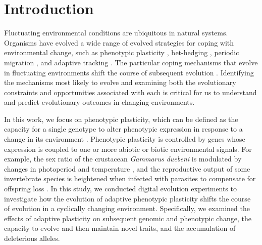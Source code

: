 
\section{Introduction}

Fluctuating environmental conditions are ubiquitous in natural systems. 
Organisms have evolved a wide range of evolved strategies for coping with environmental change, such as 
phenotypic plasticity \citep{ghalambor_adaptive_2007}, 
bet-hedging \citep{beaumont_experimental_2009}, 
periodic migration \citep{winger_long_2019}, 
and adaptive tracking \citep{barrett_adaptation_2008}.
The particular coping mechanisms that evolve in fluctuating environments shift the course of subsequent evolution \citep{wennersten_population-level_2012,schaum_plasticity_2014}.
Identifying the mechanisms most likely to evolve and examining both the evolutionary constraints and opportunities associated with each is critical for us to understand and predict evolutionary outcomes in changing environments.

In this work, we focus on phenotypic plasticity, which can be defined as the capacity for a single genotype to alter phenotypic expression in response to a change in its environment \citep{west-eberhard_developmental_2003}. 
Phenotypic plasticity is controlled by genes whose expression is coupled to one or more abiotic or biotic environmental signals. 
For example, the sex ratio of the crustacean \textit{Gammarus duebeni} is modulated by changes in photoperiod and temperature \citep{dunn_two_2005}, and the reproductive output of some invertebrate species is heightened when infected with parasites to compensate for offspring loss \citep{chadwick_parasite-mediated_2005}. 
In this study, we conducted digital evolution experiments to investigate how the evolution of adaptive phenotypic plasticity shifts the course of evolution in a cyclically changing environment.
Specifically, we examined the effects of adaptive plasticity on subsequent genomic and phenotypic change, the capacity to evolve and then maintain novel traits, and the accumulation of deleterious alleles.


